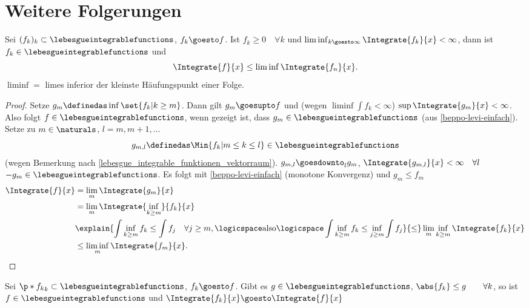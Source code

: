 \section{Weitere Folgerungen}
\begin{satz}[Fatou]\label{fatou}
  Sei \( (f_k)_k\subset \lebesgueintegrablefunctions \), \( f_k\goesto f \). Ist \( f_k\geq 0\quad \forall k \) und \( \liminf_{k \goesto \infty}\Integrate{f_k}{x}<\infty \), dann ist \( f_k\in \lebesgueintegrablefunctions \) und 
  \begin{equation*}
    \Integrate{f}{x}\leq \liminf \Integrate{f_n}{x}.
  \end{equation*}
  \( \liminf= \) limes inferior \teq der kleinste Häufungspunkt einer Folge.
\end{satz}
\begin{proof}
  Setze \( g_m\definedas \inf\set{f_k|k\geq m} \). Dann gilt \( g_m\goesupto f \) und (wegen \( \liminf \int f_k<\infty \)) \( \sup \Integrate{g_m}{x}<\infty \). Also folgt \( f\in \lebesgueintegrablefunctions \), wenn gezeigt ist, dass \( g_m\in \lebesgueintegrablefunctions \) (aus \ref{beppo-levi-einfach}). Setze zu \( m\in \naturals \), \( l=m,m+1,\dotsc \) 
  \begin{equation*}
    g_{m,l}\definedas \Min{f_k|m\leq k\leq l}\in \lebesgueintegrablefunctions
  \end{equation*}
  (wegen Bemerkung nach \ref{lebesgue_integrable_funktionen_vektorraum}). \( g_{m,l}\goesdownto_l g_m \), \( \Integrate{g_{m,l}}{x}<\infty \quad \forall l\) \timplies \( -g_m\in \lebesgueintegrablefunctions \). Es folgt mit \ref{beppo-levi-einfach} (monotone Konvergenz) und \( g_m\leq f_m \)
  \begin{align*}
    \Integrate{f}{x}&=\lim_m \Integrate{g_m}{x}\\
    &=\lim_m \Integrate{\inf_{k\geq m}}{f_k}{x}\\
    &\explain{\int{\inf_{k\geq m}{f_k}}\leq \int f_j\quad \forall j\geq m,\logicspace \text{also}\logicspace \int \inf_{k\geq m}{f_k}\leq \inf_{j\geq m}\int f_j}{\leq}\lim_m \inf_{k\geq m}\Integrate{f_k}{x}\\
    &\leq \liminf_m \Integrate{f_m}{x}.
  \end{align*}
\end{proof}
\begin{satz}\label{majorisierte_konvergenz}
  Sei \( \p*{f_k}_k\subset \lebesgueintegrablefunctions \), \( f_k\goesto f \). Gibt es \( g\in \lebesgueintegrablefunctions \), \sd \( \abs{f_k}\leq g \qquad \forall k  \), so ist \( f\in \lebesgueintegrablefunctions \) und \( \Integrate{f_k}{x}\goesto \Integrate{f}{x} \)
\end{satz}
